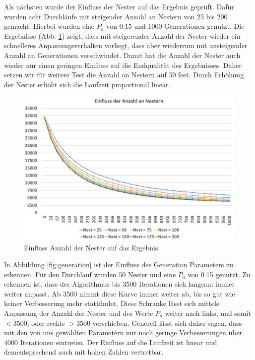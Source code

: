 \documentclass[conference]{IEEEtran}
\begin{document}
      Als nächsten wurde der Einfluss der Nester auf das Ergebnis geprüft. Dafür wurden acht Durchläufe mit steigender Anzahl an Nestern von 25 bis 200 
      gemacht. Hierbei wurden eine $P_a$ von 0.15 und 1000 Generationen genutzt. Die Ergebnisse (Abb. \ref{fig:nests}) zeigt, dass mit steigerender Anzahl der Nester wieder
      ein schnelleres Anpassungsverhalten vorliegt, dass aber wiederrum mit ansteigender Anzahl an Generationen verschwindet. Damit hat die Anzahl der Nester auch wieder
      nur einen geringen Einfluss auf die Endqualität des Ergebnisses. Daher setzen wir für weitere Test die Anzahl an Nestern auf 50 fest.
      Durch Erhöhung der Nester erhöht sich die Laufzeit proportional linear.
 

      \begin{figure}[b]
        \centering
        \includegraphics[width=1\linewidth]{Nester.png}
        \caption{Einfluss Anzahl der Nester auf das Ergebnis}
        \label{fig:nests}
      \end{figure}

      In Abbildung \ref{fig:generation} ist der Einfluss des Generation Parameters zu erkennen. Für den Durchlauf wurden 50 Nester und eine $P_a$ von 0.15 genutzt. 
      Zu erkennen ist, dass der Algorithmus bis 3500 Iterationen sich langsam immer weiter anpasst. Ab 3500 nimmt diese Kurve immer weiter ab, bis so gut wie keiner Verbesserung
      mehr stattfindet. Diese Schranke lässt sich mittels Anpassung der Anzahl der Nester und des Werte $P_a$ weiter nach links, und somit $<3500$, oder rechts $>3500$ verschieben.
      Generell lässt sich daher sagen, dass mit den von uns gewählten Parametern nur noch geringe Verbesserungen über 4000 Iterationen eintreten.
      Der Einfluss auf die Laufzeit ist linear und dementsprechend auch mit hohen Zahlen vertretbar.
\end{document}
